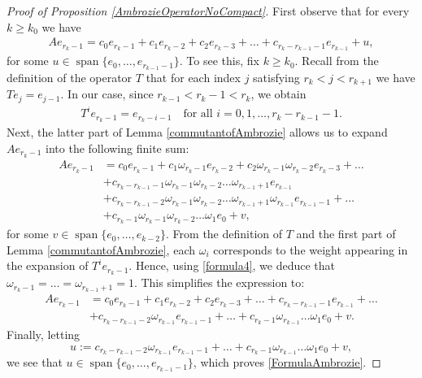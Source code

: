 \documentclass[a4paper,12pt]{article}
\theoremstyle{definition}
\numberwithin{equation}{section}
\numberwithin{thm}{section}
\begin{document}
\begin{proof}[Proof of Proposition \ref{AmbrozieOperatorNoCompact}]
First observe that for every $k\geq k_0$ we have
\begin{align}
\label{FormulaAmbrozie}
Ae_{r_k-1} = c_0e_{r_k-1} + c_1e_{r_k-2}+c_2e_{r_k-3}+\dots+c_{r_k - r_{k-1}-1}e_{r_{k-1}} + u,
\end{align}
for some $u\in \operatorname{span}\{e_0,\dots,e_{r_{k-1}-1}\}$. To see this, fix $k\geq k_0$. Recall from the definition of the operator $T$ that for each index $j$ satisfying $r_k <j <r_{k+1}$ we have $Te_j = e_{j-1}$. In our case, since $r_{k-1}<r_k-1<r_k$, we obtain 
\begin{align}
\label{formula4}
T^ie_{r_k-1} = e_{r_k-i-1}\quad\text{for all } i=0,1,\dots,r_k-r_{k-1}-1.
\end{align}
Next, the latter part of Lemma \ref{commutantofAmbrozie} allows us to expand $Ae_{r_k-1}$ into the following finite sum:
\begin{align*}
Ae_{r_k-1} &= c_0e_{r_k-1} + c_1\omega_{r_k-1}e_{r_k-2}+c_2\omega_{r_k-1}\omega_{r_k-2}e_{r_k-3}+\dots\\
&+c_{r_k - r_{k-1}-1}\omega_{r_k-1}\omega_{r_k-2}\dots \omega_{r_{k-1}+1} e_{r_{k-1}}\\
&+c_{r_k - r_{k-1}-2}\omega_{r_k-1}\omega_{r_k-2}\dots \omega_{r_{k-1}+1}\omega_{r_{k-1}} e_{r_{k-1}-1}+\dots\\
&+c_{r_k-1}\omega_{r_k-1}\omega_{r_k-2}\dots \omega_1e_0 + v,
\end{align*}
for some $v\in \operatorname{span}\{e_0,\dots,e_{k-2}\}$. From the definition of $T$ and the first part of Lemma \ref{commutantofAmbrozie}, each $\omega_i$ corresponds to the weight appearing in the expansion of $T^ie_{r_k-1}$. Hence, using \eqref{formula4}, we deduce that $\omega_{r_k-1}=\dots=\omega_{r_{k-1}+1}=1$. This simplifies the expression to:
\begin{align*}
Ae_{r_k-1} &= c_0e_{r_k-1} + c_1e_{r_k-2}+c_2e_{r_k-3}+\dots+c_{r_k - r_{k-1}-1}e_{r_{k-1}}+\dots\\
&+c_{r_k - r_{k-1}-2}\omega_{r_{k-1}} e_{r_{k-1}-1}+\dots+c_{r_k-1}\omega_{r_{k-1}}\dots \omega_1 e_0 + v.
\end{align*}
Finally, letting
$$u:=c_{r_k - r_{k-1}-2}\omega_{r_{k-1}} e_{r_{k-1}-1}+\dots+c_{r_k-1}\omega_{r_{k-1}}\dots \omega_1 e_0 + v,$$
we see that $u\in \operatorname{span}\{e_0,\dots,e_{r_{k-1}-1}\}$, which proves \eqref{FormulaAmbrozie}.


\end{proof}
\end{document}
